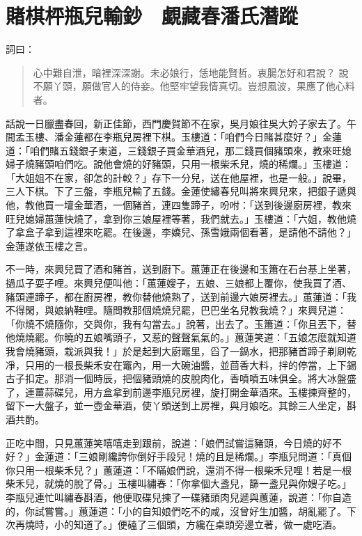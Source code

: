 
\chapter{賭棋枰瓶兒輸鈔　覷藏春潘氏潛蹤}

詞曰：
\begin{quote}
心中難自泄，暗裡深深謝。未必娘行，恁地能賢哲。衷腸怎好和君說？
說不願丫頭，願做官人的侍妾。他堅牢望我情真切。豈想風波，果應了他心料者。
\end{quote}

話說一日臘盡春回，新正佳節，西門慶賀節不在家，吳月娘往吳大妗子家去了。午間孟玉樓、潘金蓮都在李瓶兒房裡下棋。玉樓道：「咱們今日賭甚麼好？」金蓮道：「咱們賭五錢銀子東道，三錢銀子買金華酒兒，那二錢買個豬頭來，教來旺媳婦子燒豬頭咱們吃。說他會燒的好豬頭，只用一根柴禾兒，燒的稀爛。」玉樓道：「大姐姐不在家，卻怎的計較？」存下一分兒，送在他屋裡，也是一般。」說畢，三人下棋。下了三盤，李瓶兒輸了五錢。金蓮使繡春兒叫將來興兒來，把銀子遞與他，教他買一壇金華酒，一個豬首，連四隻蹄子，吩咐：「送到後邊廚房裡，教來旺兒媳婦蕙蓮快燒了，拿到你三娘屋裡等著，我們就去。」玉樓道：「六姐，教他燒了拿盒子拿到這裡來吃罷。在後邊，李嬌兒、孫雪娥兩個看著，是請他不請他？」金蓮遂依玉樓之言。

不一時，來興兒買了酒和豬首，送到廚下。蕙蓮正在後邊和玉簫在石台基上坐著，撾瓜子耍子哩。來興兒便叫他：「蕙蓮嫂子，五娘、三娘都上覆你，使我買了酒、豬頭連蹄子，都在廚房裡，教你替他燒熟了，送到前邊六娘房裡去。」蕙蓮道：「我不得閑，與娘納鞋哩。隨問教那個燒燒兒罷，巴巴坐名兒教我燒？」來興兒道：「你燒不燒隨你，交與你，我有勾當去。」說著，出去了。玉簫道：「你且丟下，替他燒燒罷。你曉的五娘嘴頭子，又惹的聲聲氣氣的。」蕙蓮笑道：「五娘怎麼就知道我會燒豬頭，栽派與我！」於是起到大廚竈里，舀了一鍋水，把那豬首蹄子剃刷乾凈，只用的一根長柴禾安在竈內，用一大碗油醬，並茴香大料，拌的停當，上下錫古子扣定。那消一個時辰，把個豬頭燒的皮脫肉化，香噴噴五味俱全。將大冰盤盛了，連薑蒜碟兒，用方盒拿到前邊李瓶兒房裡，旋打開金華酒來。玉樓揀齊整的，留下一大盤子，並一壺金華酒，使丫頭送到上房裡，與月娘吃。其餘三人坐定，斟酒共酌。

正吃中間，只見蕙蓮笑嘻嘻走到跟前，說道：「娘們試嘗這豬頭，今日燒的好不好？」金蓮道：「三娘剛纔誇你倒好手段兒！燒的且是稀爛。」李瓶兒問道：「真個你只用一根柴禾兒？」蕙蓮道：「不瞞娘們說，還消不得一根柴禾兒哩！若是一根柴禾兒，就燒的脫了骨。」玉樓叫繡春：「你拿個大盞兒，篩一盞兒與你嫂子吃。」李瓶兒連忙叫繡春斟酒，他便取碟兒揀了一碟豬頭肉兒遞與蕙蓮，說道：「你自造的，你試嘗嘗。」蕙蓮道：「小的自知娘們吃不的咸，沒曾好生加醬，胡亂罷了。下次再燒時，小的知道了。」便磕了三個頭，方纔在桌頭旁邊立著，做一處吃酒。

